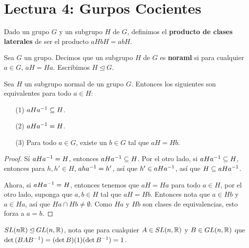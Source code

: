 \section*{Lectura 4: Gurpos Cocientes}

\begin{definition}
    Dado un grupo $G$ y un subgrupo  $H$ de  $G$, definimos el  \textbf{producto
    de clases laterales} de ser el producto $aHbH=abH$.
\end{definition}

\begin{definition}
    Sea $G$ un grupo. Decimos que un subgrupo  $H$ de  $G$ es  \textbf{noraml}
    si para cualquier $a \in G$,  $aH=Ha$. Escribimos $H \unlhd G$.
\end{definition}

\begin{lemma}\label{lemma_4.8}
    Sea $H$ un subgrupo normal de un grupo  $G$. Entonces los siguientes son
    equivalentes para todo $a \in H$:
    \begin{enumerate}
        \item[(1)] $aHa^{-1} \subseteq H$.

        \item[(2)] $aHa^{-1}=H$.

        \item[(3)] Para todo $a \in G$, existe un  $b \in G$ tal que  $aH=Hb$.
    \end{enumerate}
\end{lemma}
\begin{proof}
    S\'i $aHa^{-1}=H$, entonces $aHa^{-1} \subseteq H$. Por el otro lado, si
    $aHa^{-1} \subseteq H$, entonces para $h,h' \in H$,  $aha^{-1}=h'$, as\'i
    que $h' \in aHa^{-1}$, as\'i que $H \subseteq aHa^{-1}$.

    Ahora, si $aHa^{-1}=H$, entonces tenemos que $aH=Ha$ para todo  $a \in H$,
    por el otro lado, suponga que  $a,b \in H$ tal que  $aH=Hb$. Entonces nota
    que  $a \in Hb$ y  $a \in Ha$, as\'i que  $Ha \cap Hb \neq \emptyset$. Como
     $Ha$ y  $Hb$ son clases de equivalencias, esto forza a  $a=b$.
\end{proof}

\begin{example}\label{}
    $SL(n\mathbb{R}) \unlhd GL(n,\mathbb{R})$, nota que para cualquier $A \in SL(n,\mathbb{R})$ y $B \in
    GL(n,\mathbb{R})$ que $\det{(BAB^{-1})}=(\det{B})(1)(\det{B^{-1}})=1$.
\end{example}

